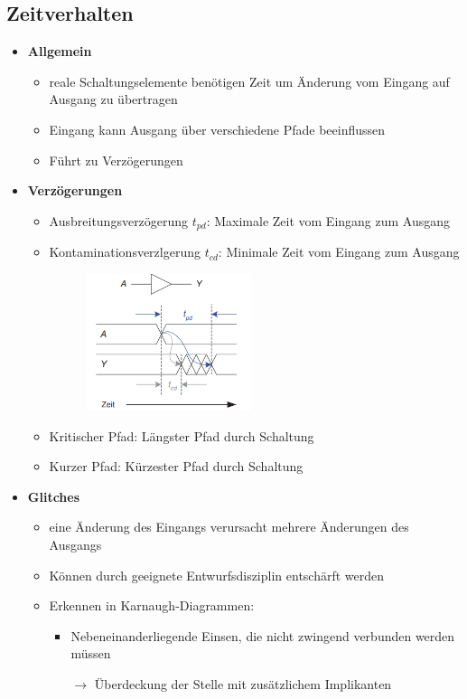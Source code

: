 \documentclass[11pt,a4paper]{article}
\begin{document}
\subsection{Zeitverhalten}
\begin{itemize}

\item \textbf{Allgemein}
	\begin{itemize}
	\item reale Schaltungselemente benötigen Zeit um Änderung vom Eingang auf Ausgang zu übertragen
	\item Eingang kann Ausgang über verschiedene Pfade beeinflussen
	\item Führt zu Verzögerungen
	\end{itemize}
	
\item \textbf{Verzögerungen}
	\begin{itemize}
	\item Ausbreitungsverzögerung $t_{pd}$: Maximale Zeit vom Eingang zum Ausgang
	\item Kontaminationsverzlgerung $t_{cd}$: Minimale Zeit vom Eingang zum Ausgang
	\item[] \begin{figure}[H]
				\begin{center}
				\includegraphics[height=4cm]{Bilder/delays1}
				\end{center}
			\end{figure}
	\item Kritischer Pfad: Längster Pfad durch Schaltung
	\item Kurzer Pfad: Kürzester Pfad durch Schaltung	
	\end{itemize}

\item \textbf{Glitches}
	\begin{itemize}
	\item eine Änderung des Eingangs verursacht mehrere Änderungen des Ausgangs
	\item Können durch geeignete Entwurfsdisziplin entschärft werden
	\item Erkennen in Karnaugh-Diagrammen:
		\begin{itemize}
		\item Nebeneinanderliegende Einsen, die nicht zwingend verbunden werden müssen
		\item[$\rightarrow$] Überdeckung der Stelle mit zusätzlichem Implikanten
		\end{itemize}
	\end{itemize}

\end{itemize}
\end{document}
